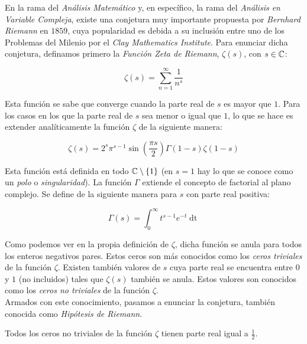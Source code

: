 En la rama del \textit{Análisis Matemático} y, en específico, la rama del \textit{Análisis en Variable Compleja}, existe una conjetura muy importante propuesta por \textit{Bernhard Riemann} en $1859$, cuya popularidad es debida a su inclusión entre uno de los Problemas del Milenio por el \textit{Clay Mathematics Institute}. Para enunciar dicha conjetura, definamos primero la \textit{Función Zeta de Riemann}, $\zeta(s)$, con $s \in \mathbb{C}$:

\begin{equation}\label{funcion_zeta_de_riemann}
\zeta(s) = \sum_{n=1}^{\infty}\frac{1}{n^s}
\end{equation}

Esta función se sabe que converge cuando la parte real de $s$ es mayor que $1$. Para los casos en los que la parte real de $s$ sea menor o igual que $1$, lo que se hace es extender analíticamente la función $\zeta$ de la siguiente manera:

\begin{equation}\label{funcion_zeta_de_riemann_extendida}
\zeta(s) = 2^s\pi^{s-1}\sin\left(\frac{\pi s}{2}\right)\Gamma(1-s)\zeta(1-s)
\end{equation}

Esta función está definida en todo $\mathbb{C} \setminus \{1\}$ (en $s = 1$ hay lo que se conoce como un \textit{polo} o \textit{singularidad}). La función $\Gamma$ extiende el concepto de factorial al plano complejo. Se define de la siguiente manera para $s$ con parte real positiva:

\begin{equation}
\Gamma(s) = \int_{0}^{\infty}t^{s-1}e^{-t}\mathop{dt}
\end{equation}

Como podemos ver en la propia definición de $\zeta$, dicha función se anula para todos los enteros negativos pares. Estos ceros son más conocidos como los \textit{ceros triviales} de la función $\zeta$. Existen también valores de $s$ cuya parte real se encuentra entre $0$ y $1$ (no incluidos) tales que $\zeta(s)$ también se anula. Estos valores son conocidos como los \textit{ceros no triviales} de la función $\zeta$.\\

Armados con este conocimiento, pasamos a enunciar la conjetura, también conocida como \textit{Hipótesis de Riemann}.

\begin{conjetura}\label{hipotesis_de_riemann}
	Todos los ceros no triviales de la función $\zeta$ tienen parte real igual a $\frac{1}{2}$.
\end{conjetura}

